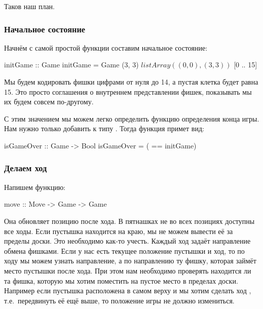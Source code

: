 Таков наш план. 

\subsubsection{Начальное состояние}

Начнём с самой простой функции
составим начальное состояние:

\begin{code}
initGame :: Game
initGame = Game (3, 3) $ listArray ((0, 0), (3, 3)) $ [0 .. 15]
\end{code}

Мы будем кодировать фишки цифрами от нуля до 14, а пустая
клетка будет равна 15. Это просто соглашения о внутреннем
представлении фишек, показывать мы их будем совсем по-другому. 

С этим значением мы можем легко определить функцию 
определения конца игры. Нам нужно только добавить
 к типу . Тогда функция 
 примет вид:

\begin{code}
isGameOver :: Game -> Bool
isGameOver = ( == initGame)
\end{code}

\subsubsection{Делаем ход}

Напишем функцию:

\begin{code}
move :: Move -> Game -> Game
\end{code}

Она обновляет позицию после хода. В пятнашках не во всех
позициях доступны все ходы. Если пустышка находится 
на краю, мы не можем вывести её за пределы доски. 
Это необходимо как-то учесть. Каждый ход задаёт направление 
обмена фишками. Если у нас есть текущее положение пустышки и
ход, то по ходу мы можем узнать направление, а по направлению
ту фишку, которая займёт место пустышки после хода.
При этом нам необходимо проверять находится ли та фишка,
которую мы хотим поместить на пустое место в пределах
доски. Например если пустышка расположена в самом верху
и мы хотим сделать ход , т.е.~передвинуть её ещё выше,
то положение игры не должно измениться. 

